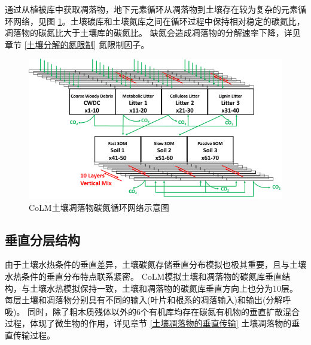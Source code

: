 通过从植被库中获取凋落物，地下元素循环从凋落物到土壤存在较为复杂的元素循环网络，见图 \ref{fig:CoLM土壤凋落物碳氮循环网络示意图}。土壤碳库和土壤氮库之间在循环过程中保持相对稳定的碳氮比，凋落物的碳氮比大于土壤库的碳氮比。
缺氮会造成凋落物的分解速率下降，详见章节 \ref{土壤分解的氮限制} 氮限制因子。
{
  \begin{figure}[htbp]
    \centering
    \includegraphics{Figures/碳氮库结构/CoLM土壤凋落物碳氮循环网络示意图.png}
    \caption{CoLM土壤凋落物碳氮循环网络示意图 \citep{huang2018matrix}  }
    \label{fig:CoLM土壤凋落物碳氮循环网络示意图}
  \end{figure}
}
\subsection{垂直分层结构}\label{垂直分层结构}
由于土壤水热条件的垂直差异，土壤碳氮存储垂直分布模拟也极其重要，且与土壤水热条件的垂直分布特点联系紧密。
CoLM模拟土壤和凋落物的碳氮库垂直结构，与土壤水热模拟保持一致，土壤和凋落物的碳氮库垂直方向上也分为10层。
每层土壤和凋落物分别具有不同的输入(叶片和根系的凋落输入)和输出(分解呼吸)。
同时，除了粗木质残体以外的6个有机库均存在碳氮有机物的垂直扩散混合过程，体现了微生物的作用，详见章节 \ref{土壤凋落物的垂直传输} 土壤凋落物的垂直传输过程。
